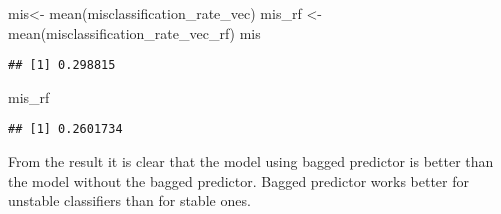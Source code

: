 \documentclass[
]{article}
\newenvironment{Shaded}{\begin{snugshade}}{\end{snugshade}}
\newcommand{\FunctionTok}[1]{\textcolor[rgb]{0.00,0.00,0.00}{#1}}
\newcommand{\NormalTok}[1]{#1}
\newcommand{\OtherTok}[1]{\textcolor[rgb]{0.56,0.35,0.01}{#1}}
\begin{document}
\begin{Shaded}
\begin{Highlighting}[]
\NormalTok{mis}\OtherTok{\textless{}{-}} \FunctionTok{mean}\NormalTok{(misclassification\_rate\_vec)}
\NormalTok{mis\_rf }\OtherTok{\textless{}{-}} \FunctionTok{mean}\NormalTok{(misclassification\_rate\_vec\_rf)}
\NormalTok{mis}
\end{Highlighting}
\end{Shaded}

\begin{verbatim}
## [1] 0.298815
\end{verbatim}

\begin{Shaded}
\begin{Highlighting}[]
\NormalTok{mis\_rf}
\end{Highlighting}
\end{Shaded}

\begin{verbatim}
## [1] 0.2601734
\end{verbatim}

From the result it is clear that the model using bagged predictor is
better than the model without the bagged predictor. Bagged predictor
works better for unstable classifiers than for stable ones.
\end{document}

